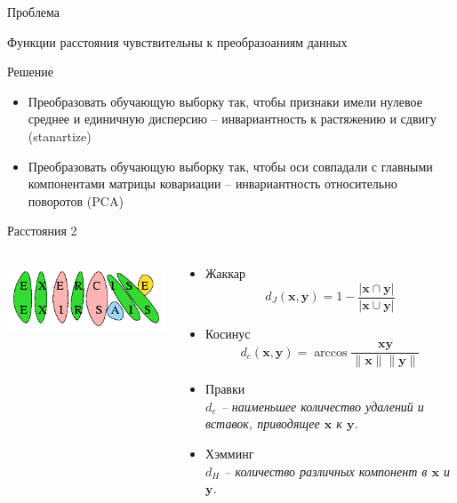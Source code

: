 \documentclass[10pt]{beamer}
\begin{document}
\begin{frame}{Проблема}

Функции расстояния чувствительны к преобразоаниям данных

\vspace{1em}
Решение
\begin{itemize}
\item Преобразовать обучающую выборку так, чтобы  признаки имели нулевое среднее и единичную дисперсию -- инвариантность к растяжению и сдвигу (stanartize)
\item Преобразовать обучающую выборку так, чтобы оси совпадали с главными компонентами матрицы ковариации -- инвариантность относительно поворотов (PCA)
\end{itemize}


\end{frame}

\begin{frame}{Расстояния 2}

\begin{columns}[T]

    \begin{column}{.4\textwidth}
    \vspace{5em}
	\begin{center}
   		\includegraphics[scale=0.5]{images/edit.png}
    \end{center}
    \end{column}
       
    \begin{column}{.6\textwidth}
    \begin{itemize}
		\item Жаккар
		\[
		d_J(\mathbf{x}, \mathbf{y}) = 1 - \frac{|\mathbf{x} \cap \mathbf{y}|}{|\mathbf{x} \cup \mathbf{y}|}
		\]
		\item Косинус
		\[
		d_c(\mathbf{x}, \mathbf{y}) = \arccos \frac{\mathbf{x} \mathbf{y}}{\|\mathbf{x}\| \|\mathbf{y}\|}
		\]
		\item Правки \\
		{\it $d_e$ -- наименьшее количество удалений и вставок, приводящее $\mathbf{x}$ к $\mathbf{y}$.}
		\item Хэмминг \\
		{\it $d_H$ -- количество различных компонент в $\mathbf{x}$ и $\mathbf{y}$.}
	\end{itemize}
    
    \end{column}
  \end{columns}

\end{frame}
\end{document}
